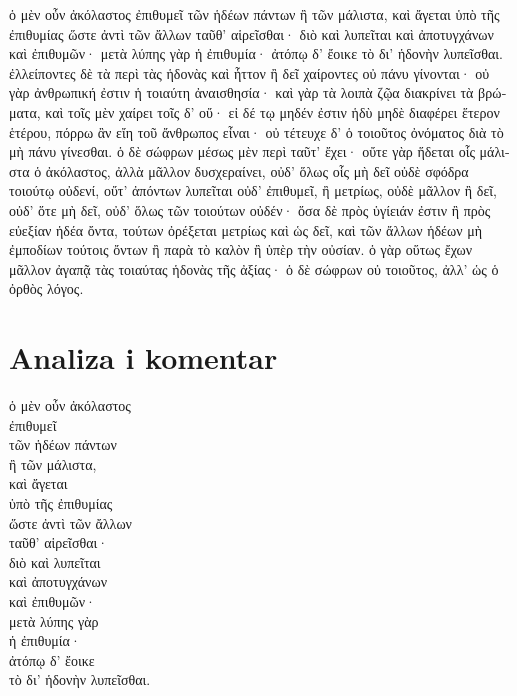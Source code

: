 {\large

\begin{greek}

\noindent  ὁ μὲν οὖν ἀκόλαστος ἐπιθυμεῖ τῶν ἡδέων πάντων ἢ τῶν μάλιστα, καὶ ἄγεται ὑπὸ τῆς ἐπιθυμίας ὥστε ἀντὶ τῶν ἄλλων ταῦθ' αἱρεῖσθαι· διὸ καὶ λυπεῖται καὶ ἀποτυγχάνων καὶ ἐπιθυμῶν· μετὰ λύπης γὰρ ἡ ἐπιθυμία· ἀτόπῳ δ' ἔοικε τὸ δι' ἡδονὴν λυπεῖσθαι. ἐλλείποντες δὲ τὰ περὶ τὰς ἡδονὰς καὶ ἧττον ἢ δεῖ χαίροντες οὐ πάνυ γίνονται· οὐ γὰρ ἀνθρωπική ἐστιν ἡ τοιαύτη ἀναισθησία· καὶ γὰρ τὰ λοιπὰ ζῷα διακρίνει τὰ βρώματα, καὶ τοῖς μὲν χαίρει τοῖς δ' οὔ· εἰ δέ τῳ μηδέν ἐστιν ἡδὺ μηδὲ διαφέρει ἕτερον ἑτέρου, πόρρω ἂν εἴη τοῦ ἄνθρωπος εἶναι· οὐ τέτευχε δ' ὁ τοιοῦτος ὀνόματος διὰ τὸ μὴ πάνυ γίνεσθαι. ὁ δὲ σώφρων μέσως μὲν περὶ ταῦτ' ἔχει· οὔτε γὰρ ἥδεται οἷς μάλιστα ὁ ἀκόλαστος, ἀλλὰ μᾶλλον δυσχεραίνει, οὐδ' ὅλως οἷς μὴ δεῖ οὐδὲ σφόδρα τοιούτῳ οὐδενί, οὔτ' ἀπόντων λυπεῖται οὐδ' ἐπιθυμεῖ, ἢ μετρίως, οὐδὲ μᾶλλον ἢ δεῖ, οὐδ' ὅτε μὴ δεῖ, οὐδ' ὅλως τῶν τοιούτων οὐδέν· ὅσα δὲ πρὸς ὑγίειάν ἐστιν ἢ πρὸς εὐεξίαν ἡδέα ὄντα, τούτων ὀρέξεται μετρίως καὶ ὡς δεῖ, καὶ τῶν ἄλλων ἡδέων μὴ ἐμποδίων τούτοις ὄντων ἢ παρὰ τὸ καλὸν ἢ ὑπὲρ τὴν οὐσίαν. ὁ γὰρ οὕτως ἔχων μᾶλλον ἀγαπᾷ τὰς τοιαύτας ἡδονὰς τῆς ἀξίας· ὁ δὲ σώφρων οὐ τοιοῦτος, ἀλλ' ὡς ὁ ὀρθὸς λόγος.
\end{greek}

}


\section*{Analiza i komentar}


{\large
\begin{greek}
\noindent  ὁ μὲν οὖν ἀκόλαστος\\
ἐπιθυμεῖ \\
\tabto{2em} τῶν ἡδέων πάντων \\
\tabto{2em} ἢ τῶν μάλιστα, \\
καὶ ἄγεται \\
\tabto{2em} ὑπὸ τῆς ἐπιθυμίας \\
\tabto{2em} ὥστε ἀντὶ τῶν ἄλλων \\
\tabto{4em} ταῦθ' αἱρεῖσθαι· \\
διὸ καὶ λυπεῖται \\
\tabto{4em} καὶ ἀποτυγχάνων \\
\tabto{4em} καὶ ἐπιθυμῶν·\\
\tabto{2em} μετὰ λύπης γὰρ \\
\tabto{4em} ἡ ἐπιθυμία· \\
\tabto{2em} ἀτόπῳ δ' ἔοικε \\
\tabto{4em} τὸ δι' ἡδονὴν λυπεῖσθαι. \\

\end{greek}
}

